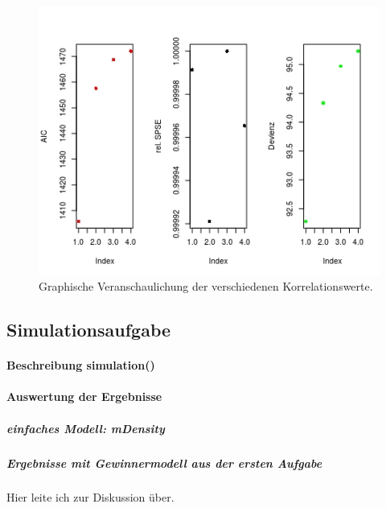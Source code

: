 \begin{figure}
\centering
\includegraphics[scale=1]{./jpgs/wic.jpeg}
\caption{Graphische Veranschaulichung der verschiedenen Korrelationswerte.}
\label{fig:wic}
\end{figure} 
\newpage 
\subsection{Simulationsaufgabe}
\paragraph{Beschreibung simulation()}
\paragraph{Auswertung der Ergebnisse}
\subparagraph{einfaches Modell: \textit{mDensity}}
\subparagraph{Ergebnisse mit Gewinnermodell aus der ersten Aufgabe}
Hier leite ich zur Diskussion \"uber.